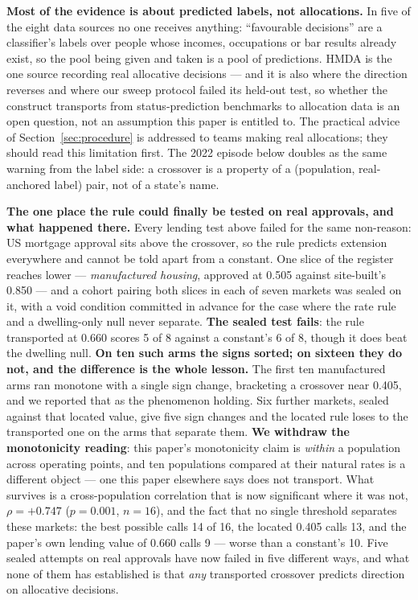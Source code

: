 \documentclass[conference]{IEEEtran}
\begin{document}
\textbf{Most of the evidence is about predicted labels, not allocations.} In five of the
eight data sources no one receives anything: ``favourable decisions'' are a classifier's
labels over people whose incomes, occupations or bar results already exist, so the pool
being given and taken is a pool of predictions. HMDA is the one source recording real
allocative decisions --- and it is also where the direction reverses and where our sweep
protocol failed its held-out test, so whether the construct transports from
status-prediction benchmarks to allocation data is an open question, not an assumption
this paper is entitled to. The practical advice of Section~\ref{sec:procedure} is
addressed to teams making real allocations; they should read this limitation first. The
2022 episode below doubles as the same warning from the label side: a crossover is a
property of a (population, real-anchored label) pair, not of a state's name.

\textbf{The one place the rule could finally be tested on real approvals, and what
happened there.} Every lending test above failed for the same non-reason: US mortgage approval
sits above the crossover, so the rule predicts extension everywhere and cannot be told apart
from a constant. One slice of the register reaches lower --- \emph{manufactured housing},
approved at 0.505 against site-built's 0.850 --- and a cohort pairing both slices in each of
seven markets was sealed on it, with a void condition committed in advance for the case where
the rate rule and a dwelling-only null never separate. \textbf{The sealed test fails}: the rule
transported at 0.660 scores 5 of 8 against a constant's 6 of 8, though it does beat the
dwelling null. \textbf{On ten such arms the signs sorted; on sixteen they do not, and the difference is
the whole lesson.} The first ten manufactured arms ran monotone with a single sign change,
bracketing a crossover near 0.405, and we reported that as the phenomenon holding. Six further
markets, sealed against that located value, give five sign changes and the located rule loses
to the transported one on the arms that separate them. \textbf{We withdraw the monotonicity
reading}: this paper's monotonicity claim is \emph{within} a population across operating
points, and ten populations compared at their natural rates is a different object --- one this
paper elsewhere says does not transport. What survives is a cross-population correlation that
is now significant where it was not, $\rho = +0.747$ ($p = 0.001$, $n = 16$), and the fact
that no single threshold separates these markets: the best possible calls 14 of 16, the
located 0.405 calls 13, and the paper's own lending value of 0.660 calls 9 --- worse than a
constant's 10. Five sealed attempts on real approvals have now failed in five different ways,
and what none of them has established is that \emph{any} transported crossover predicts
direction on allocative decisions.
\end{document}
